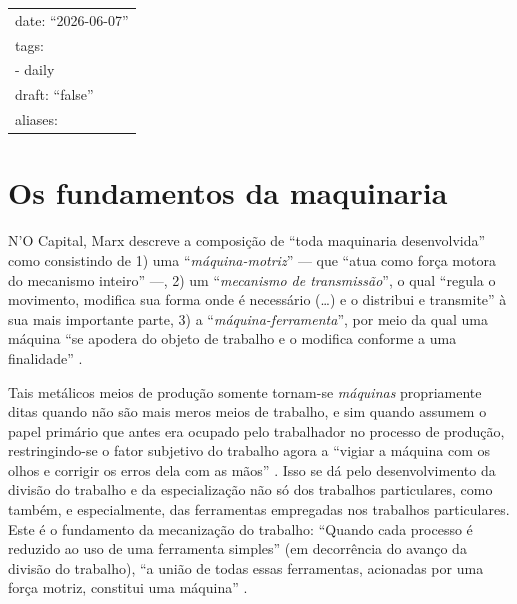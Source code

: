 \documentclass[12pt]{article}
\title{}
\author{}
\date{}
\numberwithin{equation}{section}
\theoremstyle{plain}
\theoremstyle{definition}
\theoremstyle{remark}
\begin{document}
\maketitle

\begin{longtable}[]{@{}l@{}}
\toprule\noalign{}
\endhead
\bottomrule\noalign{}
\endlastfoot
date: ``2026-06-07'' \\
tags: \\
- daily \\
draft: ``false'' \\
aliases: \\
\end{longtable}

\hypertarget{os-fundamentos-da-maquinaria}{%
\section{Os fundamentos da maquinaria}\label{os-fundamentos-da-maquinaria}}

N'O Capital, Marx descreve a composição de ``toda maquinaria desenvolvida'' como consistindo de 1) uma ``\textit{máquina-motriz}'' --- que ``atua como força motora do mecanismo inteiro'' ---, 2) um ``\textit{mecanismo de transmissão}'', o qual ``regula o movimento, modifica sua forma onde é necessário (\ldots) e o distribui e transmite'' à sua mais importante parte, 3) a ``\textit{máquina-ferramenta}'', por meio da qual uma máquina ``se apodera do objeto de trabalho e o modifica conforme a uma finalidade'' \parencite[, p. 446-7, grifo meu]{Marx2017}.

Tais metálicos meios de produção somente tornam-se \textit{máquinas} propriamente ditas quando não são mais meros meios de trabalho, e sim quando assumem o papel primário que antes era ocupado pelo trabalhador no processo de produção, restringindo-se o fator subjetivo do trabalho agora a ``vigiar a máquina com os olhos e corrigir os erros dela com as mãos'' \parencite[, p. 448]{Marx2017}. Isso se dá pelo desenvolvimento da divisão do trabalho e da especialização não só dos trabalhos particulares, como também, e especialmente, das ferramentas empregadas nos trabalhos particulares. Este é o fundamento da mecanização do trabalho: ``Quando cada processo é reduzido ao uso de uma ferramenta simples'' (em decorrência do avanço da divisão do trabalho), ``a união de todas essas ferramentas, acionadas por uma força motriz, constitui uma máquina'' \parencite[, p. 136 (§167)]{Babbage2009}.
\end{document}
